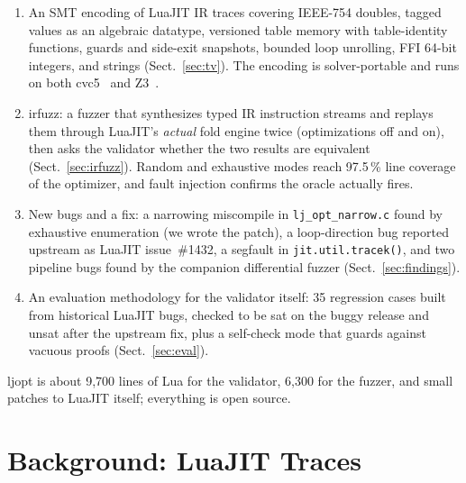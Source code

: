\documentclass[runningheads]{llncs}
\newif\iffull \fulltrue
\newcommand{\full}[1]{#1}
\newcommand{\brief}[1]{}
\newcommand{\full}[1]{}
\newcommand{\brief}[1]{#1}
\newcommand{\ljopt}{\textsf{ljopt}}
\newcommand{\irfuzz}{\textsf{irfuzz}}
\begin{document}
\begin{enumerate}
\item An SMT encoding of LuaJIT IR traces covering IEEE-754 doubles, tagged
      values as an algebraic datatype, versioned table memory\full{ with
      table-identity functions}, guards and side-exit snapshots, bounded
      loop unrolling, FFI 64-bit integers, and strings
      (Sect.~\ref{sec:tv}). The encoding is solver-portable and runs on
      both cvc5~\cite{barbosa2022cvc5} and Z3~\cite{demoura2008z3}.
\item \irfuzz{}: a fuzzer that synthesizes typed IR instruction streams and
      replays them through LuaJIT's \emph{actual} fold engine twice
      (optimizations off and on), then asks the validator whether the two
      results are equivalent (Sect.~\ref{sec:irfuzz}). Random and
      exhaustive modes reach 97.5\,\% line coverage of the optimizer, and
      fault injection confirms the oracle actually fires.
\item New bugs and a fix: a narrowing miscompile in
      \texttt{lj\_opt\_narrow.c} found by exhaustive enumeration (we wrote
      the patch)\full{, a loop-direction bug reported upstream as LuaJIT
      issue~\#1432, a segfault in \texttt{jit.util.tracek()}, and two
      pipeline bugs found by the companion differential fuzzer}
      (Sect.~\ref{sec:findings}).\brief{ A 35-case corpus of historical
      LuaJIT bugs, validated \textsf{sat}-on-buggy /
      \textsf{unsat}-on-fixed (Sect.~\ref{sec:eval}).}
\iffull
\item An evaluation methodology for the validator itself: 35 regression
      cases built from historical LuaJIT bugs, checked to be \textsf{sat}
      on the buggy release and \textsf{unsat} after the upstream fix, plus
      a self-check mode that guards against vacuous proofs
      (Sect.~\ref{sec:eval}).
\fi
\end{enumerate}

\iffull
\ljopt{} is about 9,700 lines of Lua for the validator, 6,300 for the
fuzzer, and small patches to LuaJIT itself; everything is open source.
\fi

\section{Background: LuaJIT Traces}\label{sec:background}
\end{document}

